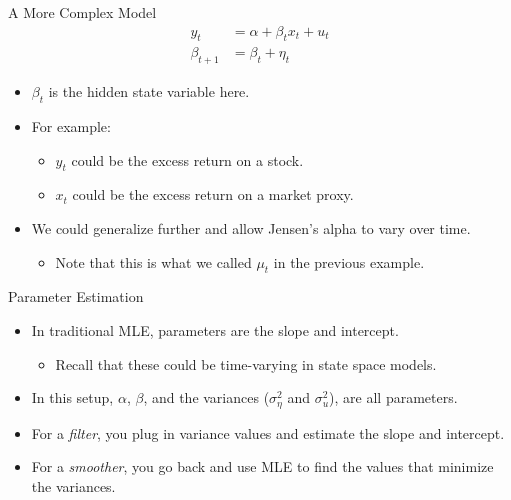 \documentclass[dvipsnames,mathserif]{beamer}
\begin{document}
{\begin{frame}{A More Complex Model}
	\begin{align}
		y_t		&=	\alpha + \beta_t x_t + u_t	\\
		\beta_{t+1} 	&=	\beta_t + \eta_t
	\end{align}
	\begin{itemize}
		\item $\beta_t$ is the hidden state variable here. 
		\item For example:
		\begin{itemize}
			\item $y_t$ could be the excess return on a stock.
			\item $x_t$ could be the excess return on a market proxy.
		\end{itemize}
		\item We could generalize further and allow Jensen's alpha to vary over time.
		\pause
		\begin{itemize}
			\item Note that this is what we called $\mu_t$ in the previous example.
		\end{itemize}
	\end{itemize}
\end{frame}

\begin{frame}{Parameter Estimation}
	\begin{itemize}
		\item In traditional MLE, parameters are the slope and intercept.
		\begin{itemize}
			\item Recall that these could be time-varying in state space models.
		\end{itemize}
		\item In this setup, $\alpha$, $\beta$, and the variances ($\sigma_\eta^2$ and $\sigma_u^2$), are all parameters.
		\item For a \textit{filter}, you plug in variance values and estimate the slope and intercept.
		\item For a \textit{smoother}, you go back and use MLE to find the values that minimize the variances.
	\end{itemize}
\end{frame}

}
\end{document}
